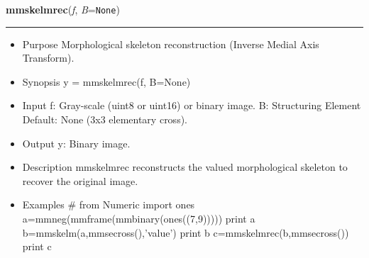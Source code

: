     \begin{boxedminipage}{\textwidth}

    \raggedright \textbf{mmskelmrec}(\textit{f}, \textit{B}=\texttt{N\-o\-n\-e\-})

    \vspace{-1.5ex}

    \rule{\textwidth}{0.5\fboxrule}
    \begin{itemize}
    \setlength{\parskip}{0.6ex}
      \item Purpose Morphological skeleton reconstruction (Inverse Medial 
        Axis Transform).

      \item Synopsis y = mmskelmrec(f, B=None)

      \item Input f: Gray-scale (uint8 or uint16) or binary image. B: 
        Structuring Element Default: None (3x3 elementary cross).

      \item Output y: Binary image.

      \item Description mmskelmrec reconstructs the valued morphological 
        skeleton to recover the original image.

      \item Examples \# from Numeric import ones 
        a=mmneg(mmframe(mmbinary(ones((7,9))))) print a 
        b=mmskelm(a,mmsecross(),'value') print b 
        c=mmskelmrec(b,mmsecross()) print c

    \end{itemize}

    \vspace{1ex}

    \end{boxedminipage}

    \label{multireg:num_pymorph:mmskiz}
    \vspace{0.5ex}

